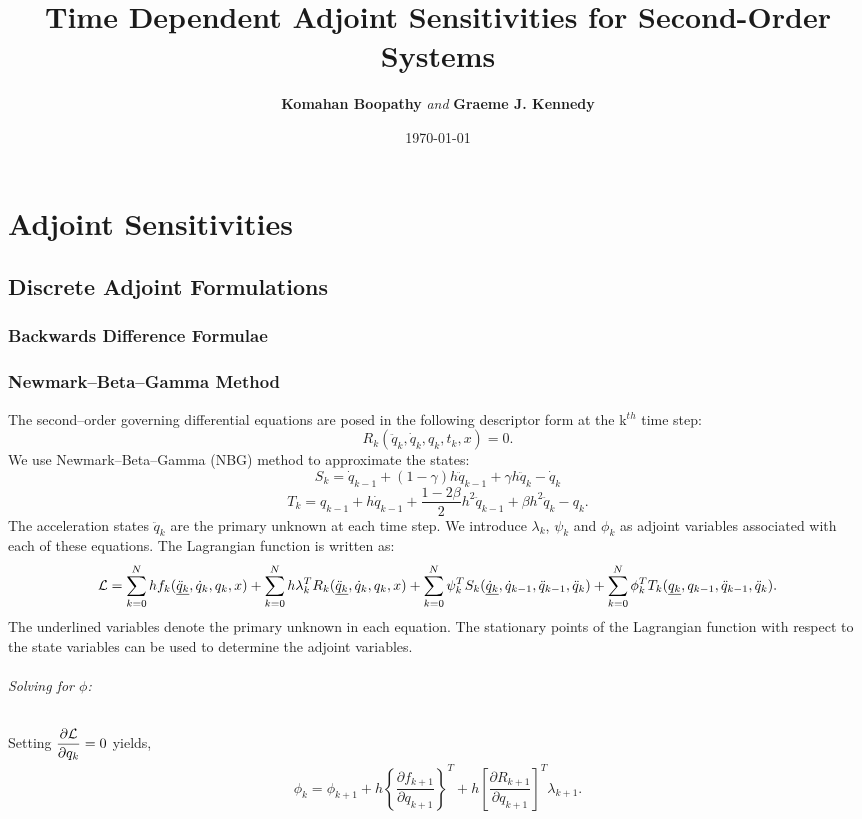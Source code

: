 \documentclass[10pt,letter]{book}
\title{\LARGE \textbf{Time Dependent Adjoint Sensitivities for Second-Order Systems}}
\author{\textbf{Komahan Boopathy} \textit{and} \textbf{Graeme J. Kennedy}}
\date{\today}
\newcommand{\pd}[2]{\dfrac{\partial #1}{\partial #2}}
\begin{document}
\maketitle


\part{Adjoint Sensitivities}

\chapter{Discrete Adjoint Formulations}

\section{Backwards Difference Formulae}

\section{Newmark--Beta--Gamma Method}

The second--order governing differential equations are posed in the following
descriptor form at the k$^{th}$ time step:
$$ R_k(\ddot{q}_k, \dot{q}_k, q_k, t_k , x) = 0.$$
We use Newmark--Beta--Gamma (NBG) method to approximate the states:
$$ S_k =  \dot{q}_{k-1}  + (1-\gamma) h \ddot{q}_{k-1} +  \gamma h \ddot{q}_{k}- \dot{q}_k$$ 
$$ T_k = {q}_{k-1} + h \dot{q}_{k-1} +\frac{1-2\beta}{2}
h^2\ddot{q}_{k-1}+ \beta h^2 \ddot{q}_k-{q}_k.$$ The acceleration
states $\ddot{q}_k$ are the primary unknown at each time step. We
introduce $\lambda_k$, $\psi_k$ and $\phi_k$ as adjoint variables
associated with each of these equations. The Lagrangian function is
written as:
$${\cal{L}} = \sum_{k=0}^N h f_k(\underline{\ddot{q}_k},
\dot{q}_k, q_k, x) + \sum_{k=0}^N h \lambda_k^T
R_k(\underline{\ddot{q}_k}, \dot{q}_k, q_k, x) + \sum_{k=0}^N \psi_k^T
S_k(\underline{\dot{q}_k}, \dot{q}_{k-1}, \ddot{q}_{k-1},
\ddot{q}_{k}) + \sum_{k=0}^N \phi_k^T T_k(\underline{{q}_k},
     {q}_{k-1}, \ddot{q}_{k-1}, \ddot{q}_{k}). $$     
     The underlined variables denote the primary unknown in each equation. 
     The stationary points of the Lagrangian function with respect to the state variables can be used to determine the adjoint
     variables.
     \paragraph{Solving for $\phi$:} Setting $\pd{\cal{L}}{{q}_k} = 0$ yields,
     \begin{equation}
       \begin{split}
         \phi_k = \phi_{k+1} +  h \left\{\pd{f_{k+1}}{{q}_{k+1}} \right\}^T + h \left[ \pd{R_{k+1}}{{q}_{k+1}} \right]^T \lambda_{k+1}.
       \end{split}
     \end{equation}
\end{document}
